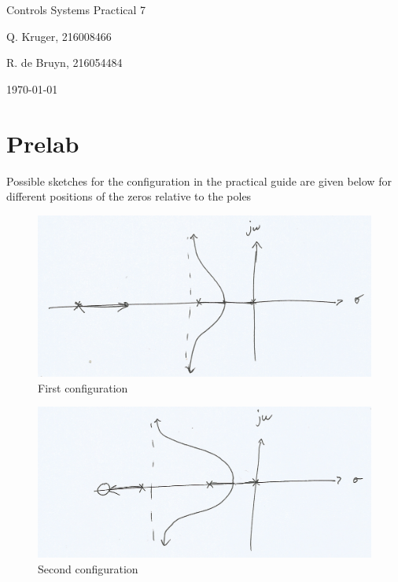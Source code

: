 \documentclass[12pt, a4paper]{article}
\begin{document}
		\begin{titlepage}
			\centering
			{\LARGE Controls Systems Practical 7\par}
			\vspace*{1.5cm}
			{\large Q. Kruger, 216008466 \par}
			{\large R. de Bruyn, 216054484 \par}
			\vspace*{1.2cm}
			{\large \today}
			\vspace*{\fill}
			\vspace*{\fill}
		\end{titlepage}

	\tableofcontents
	\listoffigures
	\newpage

	\section{Prelab} %
	\label{sec:prelab}
		Possible sketches for the configuration in the practical guide are given below for different positions of the zeros relative to the poles

		\begin{figure}[H]
			\centering
			\includegraphics[width=\textwidth]{img/rlocus1.jpg}
			\caption{First configuration}
		\end{figure}
		
		\begin{figure}[H]
			\centering
			\includegraphics[width=\textwidth]{img/rlocus2.jpg}
			\caption{Second configuration}
		\end{figure}
\end{document}
